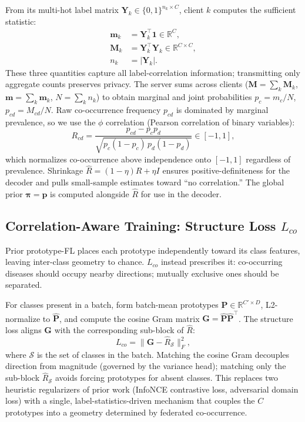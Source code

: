 \documentclass[conference]{IEEEtran}
\theoremstyle{definition}
\newcommand{\Rhat}{\widehat{R}}
\begin{document}
From its multi-hot label matrix $\mathbf{Y}_k{\in}\{0,1\}^{n_k\times C}$, client $k$ computes the sufficient statistic:
\begin{equation}
\begin{aligned}
\mathbf{m}_k&=\mathbf{Y}_k^{\top}\mathbf{1}\in\mathbb{R}^{C},\\
\mathbf{M}_k&=\mathbf{Y}_k^{\top}\mathbf{Y}_k\in\mathbb{R}^{C\times C},\\
n_k&=|\mathbf{Y}_k|.
\end{aligned}
\label{eq:suffstat}
\end{equation}
These three quantities capture all label-correlation information; transmitting only aggregate counts preserves privacy. The server sums across clients ($\mathbf{M}{=}\sum_k\mathbf{M}_k$, $\mathbf{m}{=}\sum_k\mathbf{m}_k$, $N{=}\sum_k n_k$) to obtain marginal and joint probabilities $p_c{=}m_c/N$, $p_{cd}{=}M_{cd}/N$. Raw co-occurrence frequency $p_{cd}$ is dominated by marginal prevalence, so we use the $\phi$ correlation (Pearson correlation of binary variables):
\begin{equation}
R_{cd}=\frac{p_{cd}-p_c p_d}{\sqrt{p_c(1-p_c)\,p_d(1-p_d)}}\in[-1,1],
\label{eq:phi}
\end{equation}
which normalizes co-occurrence above independence onto $[-1,1]$ regardless of prevalence. Shrinkage $\Rhat=(1-\eta)R+\eta I$ ensures positive-definiteness for the decoder and pulls small-sample estimates toward ``no correlation.'' The global prior $\boldsymbol\pi=\mathbf{p}$ is computed alongside $\Rhat$ for use in the decoder.

\subsection{Correlation-Aware Training: Structure Loss $L_{co}$}
\label{sec:lco}

Prior prototype-FL places each prototype independently toward its class features, leaving inter-class geometry to chance. $L_{co}$ instead prescribes it: co-occurring diseases should occupy nearby directions; mutually exclusive ones should be separated.

For classes present in a batch, form batch-mean prototypes $\mathbf{P}{\in}\mathbb{R}^{C'\times D}$, L2-normalize to $\hat{\mathbf{P}}$, and compute the cosine Gram matrix $\mathbf{G}{=}\hat{\mathbf{P}}\hat{\mathbf{P}}^{\top}$. The structure loss aligns $\mathbf{G}$ with the corresponding sub-block of $\Rhat$:
\begin{equation}
L_{co}=\big\|\mathbf{G}-\Rhat_{\mathcal{S}}\big\|_F^{2},
\label{eq:lco}
\end{equation}
where $\mathcal{S}$ is the set of classes in the batch. Matching the cosine Gram decouples direction from magnitude (governed by the variance head); matching only the sub-block $\Rhat_{\mathcal{S}}$ avoids forcing prototypes for absent classes. This replaces two heuristic regularizers of prior work (InfoNCE contrastive loss, adversarial domain loss) with a single, label-statistics-driven mechanism that couples the $C$ prototypes into a geometry determined by federated co-occurrence.
\end{document}
